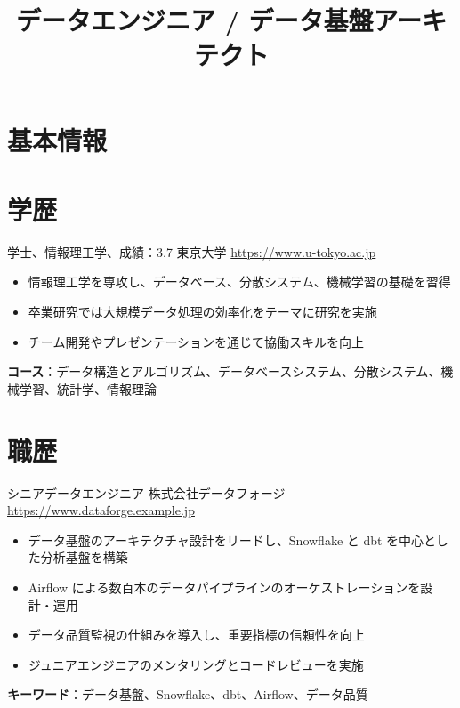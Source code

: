 \documentclass[a4paper, serif, 10pt]{moderncv}
\title{データエンジニア / データ基盤アーキテクト}
\begin{document}
\maketitle

\section{基本情報}

\section{学歴}

        {学士、情報理工学、成績：3.7}
        {東京大学}
        {\url{https://www.u-tokyo.ac.jp}}
        {}
        {\begin{itemize}
\item 情報理工学を専攻し、データベース、分散システム、機械学習の基礎を習得
\item 卒業研究では大規模データ処理の効率化をテーマに研究を実施
\item チーム開発やプレゼンテーションを通じて協働スキルを向上
\end{itemize}
\textbf{コース}：データ構造とアルゴリズム、データベースシステム、分散システム、機械学習、統計学、情報理論}
\section{職歴}

        {シニアデータエンジニア}
        {株式会社データフォージ}
        {\url{https://www.dataforge.example.jp}}
        {}
        {\begin{itemize}
\item データ基盤のアーキテクチャ設計をリードし、Snowflake と dbt を中心とした分析基盤を構築
\item Airflow による数百本のデータパイプラインのオーケストレーションを設計・運用
\item データ品質監視の仕組みを導入し、重要指標の信頼性を向上
\item ジュニアエンジニアのメンタリングとコードレビューを実施
\end{itemize}
\textbf{キーワード}：データ基盤、Snowflake、dbt、Airflow、データ品質}
\end{document}
